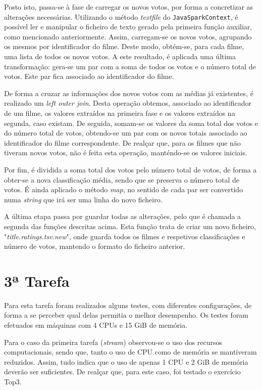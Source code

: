 \documentclass[a4paper]{report}
\begin{document}
            Posto isto, passa-se à fase de carregar os novos votos, por forma a concretizar as alterações necessárias.
            Utilizando o método \textit{textfile} do \texttt{JavaSparkContext}, é possível ler e manipular o ficheiro de texto gerado pela primeira função auxiliar, como mencionado anteriormente.
            Assim, carregam-se os novos votos, agrupando os mesmos por identificador do filme. Deste modo, obtém-se, para cada filme, uma lista de todos os novos votos.
            A este resultado, é aplicada uma última transformação: gera-se um par com a soma de todos os votos e o número total de votos. Este par fica associado ao identificador do filme.

            De forma a cruzar as informações dos novos votos com as médias já existentes, é realizado um \textit{left outer join}.
            Desta operação obtemos, associado ao identificador de um filme, os valores extraídos na primeira fase e os valores extraídos na segunda, caso existam.
            De seguida, somam-se os valores da soma total dos votos e do número total de votos, obtendo-se um par com os novos totais associado ao identificador do filme correspondente.
            De realçar que, para os filmes que não tiveram novos votos, não é feita esta operação, manténdo-se os valores iniciais.

            Por fim, é dividida a soma total dos votos pelo número total de votos, de forma a obter-se a nova classificação média, sendo que se preserva o número total de votos.
            É ainda aplicado o método \textit{map}, no sentido de cada par ser convertido numa \textit{string} que irá ser uma linha do novo ficheiro.

            A última etapa passa por guardar todas as alterações, pelo que é chamada a segunda das funções descritas acima.
            Esta função trata de criar um novo ficheiro, "\textsl{title.ratings.tsv.new}", onde guarda todos os filmes e respetivos classificações e número de votos, mantendo o formato do ficheiro anterior.


    \section{3ª Tarefa} \label{sec:Task3}
    Para esta tarefa foram realizados alguns testes, com diferentes configurações, de forma a se perceber qual delas permitia o melhor desempenho.
    Os testes foram efetuados em máquinas com 4 CPUs e 15 GiB de memória.

    Para o caso da primeira tarefa (\textit{stream}) observou-se o uso dos recursos computacionais, sendo que, tanto o uso de CPU como de memória se mantiveram reduzidos.
    Assim, tudo indica que o uso de apenas 1 CPU e 2 GiB de memória deverão ser suficientes.
    De realçar que, para este caso, foi testado o exercício Top3.
\end{document}

